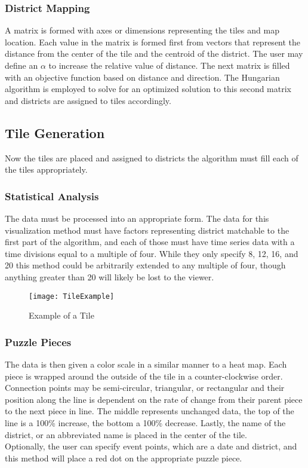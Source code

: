 \documentclass[a4paper,man,natbib]{apa6}
\begin{document}
		\subsubsection{District Mapping}
		A matrix is formed with axes or dimensions representing the tiles and map location. Each value in the matrix is formed first from vectors that represent the distance from the center of the tile and the centroid of the district. The user may define an $\alpha$ to increase the relative value of distance. The next matrix is filled with an objective function based on distance and direction. The Hungarian algorithm is employed to solve for an optimized solution to this second matrix and districts are assigned to tiles accordingly.
	
	\subsection{Tile Generation}
	Now the tiles are placed and assigned to districts the algorithm must fill each of the tiles appropriately.
		\subsubsection{Statistical Analysis}
		The data must be processed into an appropriate form. The data for this visualization method must have factors representing district matchable to the first part of the algorithm, and each of those must have time series data with a time divisions equal to a multiple of four. While they only specify 8, 12, 16, and 20 this method could be arbitrarily extended to any multiple of four, though anything greater than 20 will likely be lost to the viewer. \\
		
		\begin{wrapfigure}{R}{0.45\textwidth}
			\centering
			\texttt{[image: TileExample]}
			\caption{Example of a Tile}
		\end{wrapfigure}
	
		\subsubsection{Puzzle Pieces}
		The data is then given a color scale in a similar manner to a heat map. Each piece is wrapped around the outside of the tile in a counter-clockwise order. Connection points may be semi-circular, triangular, or rectangular and their position along the line is dependent on the rate of change from their parent piece to the next piece in line. The middle represents unchanged data, the top of the line is a 100\% increase, the bottom a 100\% decrease. Lastly, the name of the district, or an abbreviated name is placed in the center of the tile. \\
		Optionally, the user can specify event points, which are a date and district, and this method will place a red dot on the appropriate puzzle piece. \\
\end{document}
